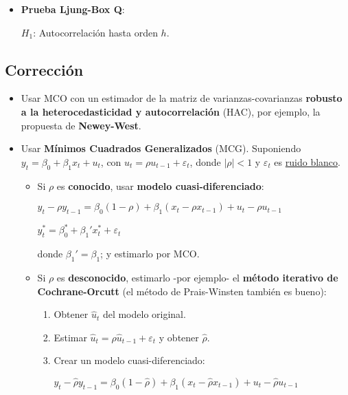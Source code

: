\documentclass[10pt, a4paper, landscape]{article}
\begin{document}
\begin{multicols}{3}
\begin{itemize}[leftmargin=*]
	\item \textbf{Prueba Ljung-Box Q}:

	\( H_{1} \): Autocorrelación hasta orden \( h \).
\end{itemize}

\columnbreak

\subsection*{Corrección}

\begin{itemize}[leftmargin=*]
	\item Usar MCO con un estimador de la matriz de varianzas-covarianzas \textbf{robusto a la heterocedasticidad y autocorrelación} (HAC), por ejemplo, la propuesta de \textbf{Newey-West}.
	\item Usar \textbf{Mínimos Cuadrados Generalizados} (MCG). Suponiendo \( y_{t} = \beta_{0} + \beta_{1} x_{t} + u_{t} \), con \( u_{t} = \rho u_{t - 1} + \varepsilon_{t} \), donde \( \lvert \rho \rvert < 1 \) y \( \varepsilon_{t} \) es \underline{ruido blanco}.
	\begin{itemize}[leftmargin=*]
		\item Si \( \rho \) es \textbf{conocido}, usar \textbf{modelo cuasi-diferenciado}:
		\begin{center}
			\( y_{t} - \rho y_{t - 1}= \beta_{0} (1 - \rho) + \beta_{1} (x_{t} - \rho x_{t - 1}) + u_{t} - \rho u_{t - 1} \)

			\( y_{t}^{*} = \beta_{0}^{*} + \beta_{1}' x_{t}^{*} + \varepsilon_{t} \)
		\end{center}
		donde \( \beta_{1}' = \beta_{1} \); y estimarlo por MCO.
		\item Si \( \rho \) es \textbf{desconocido}, estimarlo -por ejemplo- el \textbf{método iterativo de Cochrane-Orcutt} (el método de Prais-Winsten también es bueno):
		\begin{enumerate}[leftmargin=*]
			\item Obtener \( \hat{u}_{t} \) del modelo original.
			\item Estimar \( \hat{u}_{t} = \rho \hat{u}_{t - 1} + \varepsilon_{t} \) y obtener \( \hat{\rho} \).
			\item Crear un modelo cuasi-diferenciado:
			\begin{center}
				\( y_{t} - \hat{\rho}y_{t - 1} = \beta_{0} (1 - \hat{\rho}) + \beta_{1} (x_{t} - \hat{\rho} x_{t - 1}) + u_{t} - \hat{\rho}u_{t - 1} \)


\end{center}
\end{enumerate}
\end{itemize}
\end{itemize}
\end{multicols}
\end{document}

